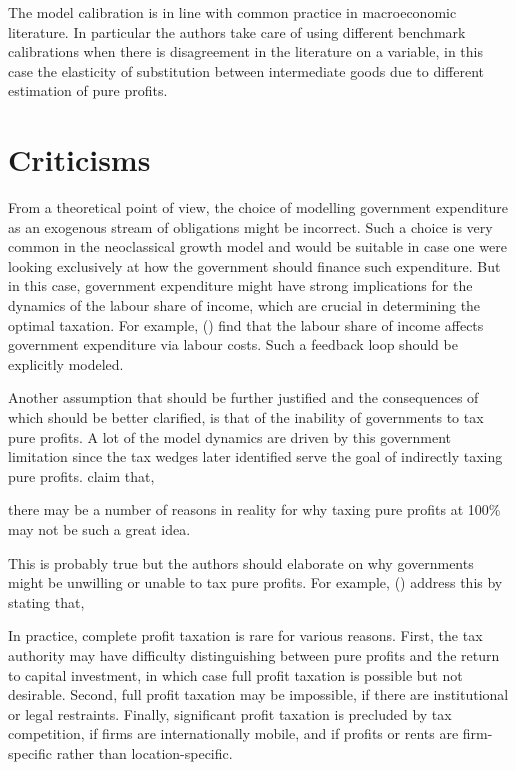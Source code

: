 \documentclass[american]{scrartcl}
\newcommand{\citein}[1]{\citeauthor{#1} (\citeyear{#1})}
\begin{document}
The model calibration is in line with common practice in macroeconomic literature. In particular the authors take care of using different benchmark calibrations when there is disagreement in the literature on a variable, in this case the elasticity of substitution between intermediate goods due to different estimation of pure profits.

\section{Criticisms}

From a theoretical point of view, the choice of modelling government expenditure as an exogenous stream of obligations might be incorrect. Such a choice is very common in the neoclassical growth model and would be suitable in case one were looking exclusively at how the government should finance such expenditure. But in this case, government expenditure might have strong implications for the dynamics of the labour share of income, which are crucial in determining the optimal taxation. For example, \citein{Facchini2016} find that the labour share of income affects government expenditure via labour costs. Such a feedback loop should be explicitly modeled.

Another assumption that should be further justified and the consequences of which should be better clarified, is that of the inability of governments to tax pure profits. A lot of the model dynamics are driven by this government limitation since the tax wedges later identified serve the goal of indirectly taxing pure profits. \citeauthor{Atesagaoglu2020} claim that,

\begin{displayquote}[p. 12]
    there may be a number of reasons in reality for why taxing pure profits at 100\% may not be such a great idea.
\end{displayquote}

This is probably true but the authors should elaborate on why governments might be unwilling or unable to tax pure profits. For example, \citein{Huizinga1997} address this by stating that,


\begin{displayquote}[p. 156]
    In practice, complete profit taxation is rare for various reasons. First, the tax authority may have difficulty distinguishing between pure profits and the return to capital investment, in which case full profit taxation is possible but not desirable. Second, full profit taxation may be impossible, if there are institutional or legal restraints. Finally, significant profit taxation is precluded by tax competition, if firms are internationally mobile, and if profits or rents are firm-specific rather than location-specific.
\end{displayquote}
\end{document}
